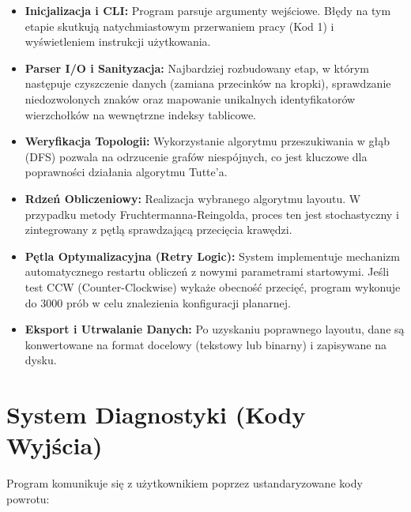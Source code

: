 \documentclass[12pt,a4paper]{article}
\begin{document}
\begin{itemize}
    \item \textbf{Inicjalizacja i CLI:} Program parsuje argumenty wejściowe. Błędy na tym etapie skutkują natychmiastowym przerwaniem pracy (Kod 1) i wyświetleniem instrukcji użytkowania.
    \item \textbf{Parser I/O i Sanityzacja:} Najbardziej rozbudowany etap, w którym następuje czyszczenie danych (zamiana przecinków na kropki), sprawdzanie niedozwolonych znaków oraz mapowanie unikalnych identyfikatorów wierzchołków na wewnętrzne indeksy tablicowe.
    \item \textbf{Weryfikacja Topologii:} Wykorzystanie algorytmu przeszukiwania w głąb (DFS) pozwala na odrzucenie grafów niespójnych, co jest kluczowe dla poprawności działania algorytmu Tutte'a.
    \item \textbf{Rdzeń Obliczeniowy:} Realizacja wybranego algorytmu layoutu. W przypadku metody Fruchtermanna-Reingolda, proces ten jest stochastyczny i zintegrowany z pętlą sprawdzającą przecięcia krawędzi.
    \item \textbf{Pętla Optymalizacyjna (Retry Logic):} System implementuje mechanizm automatycznego restartu obliczeń z nowymi parametrami startowymi. Jeśli test CCW (Counter-Clockwise) wykaże obecność przecięć, program wykonuje do 3000 prób w celu znalezienia konfiguracji planarnej.
    \item \textbf{Eksport i Utrwalanie Danych:} Po uzyskaniu poprawnego layoutu, dane są konwertowane na format docelowy (tekstowy lub binarny) i zapisywane na dysku.
\end{itemize}


\section{System Diagnostyki (Kody Wyjścia)}
Program komunikuje się z użytkownikiem poprzez ustandaryzowane kody powrotu:
\end{document}
